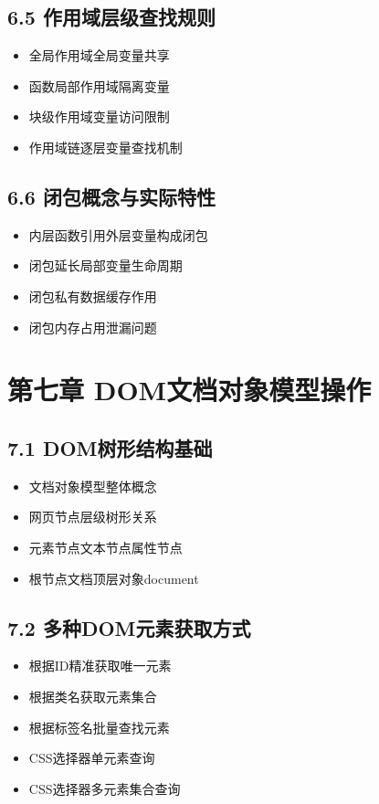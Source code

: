 \subsection{6.5 作用域层级查找规则}
\begin{itemize}
\item 全局作用域全局变量共享
\item 函数局部作用域隔离变量
\item 块级作用域变量访问限制
\item 作用域链逐层变量查找机制
\end{itemize}

\subsection{6.6 闭包概念与实际特性}
\begin{itemize}
\item 内层函数引用外层变量构成闭包
\item 闭包延长局部变量生命周期
\item 闭包私有数据缓存作用
\item 闭包内存占用泄漏问题
\end{itemize}

\section{第七章 DOM文档对象模型操作}
\subsection{7.1 DOM树形结构基础}
\begin{itemize}
\item 文档对象模型整体概念
\item 网页节点层级树形关系
\item 元素节点文本节点属性节点
\item 根节点文档顶层对象document
\end{itemize}

\subsection{7.2 多种DOM元素获取方式}
\begin{itemize}
\item 根据ID精准获取唯一元素
\item 根据类名获取元素集合
\item 根据标签名批量查找元素
\item CSS选择器单元素查询
\item CSS选择器多元素集合查询
\end{itemize}

